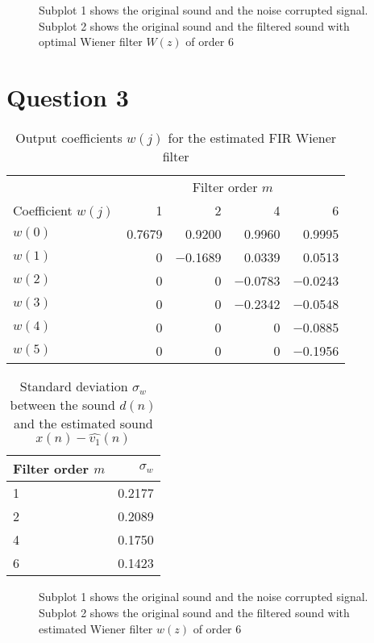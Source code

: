 \documentclass[12pt,a4paper]{article}
\begin{document}
\begin{figure}[h!]
\centering

\caption{Subplot 1 shows the original sound and the noise corrupted signal. Subplot 2 shows the original sound and the filtered sound with optimal Wiener filter $W(z)$ of order \num{6}}
\end{figure}

\clearpage\section*{Question 3}

\begin{table}[h!]
\centering
\caption{Output coefficients $w(j)$ for the estimated FIR Wiener filter}
\begin{tabular}{l r r r r}
\hline
 & \multicolumn{4}{c}{Filter order $m$}\\
 \cline{2-5}
Coefficient $w(j)$ & \num{1} & \num{2} & \num{4} & \num{6} \\
\hline
$w(0)$ & \num{0.7679} & \num{0.9200}& \num{0.9960} & \num{0.9995} \\
$w(1)$ & \num{0} & \num{-0.1689}& \num{0.0339}& \num{0.0513} \\
$w(2)$ & \num{0}& \num{0}& \num{-0.0783}& \num{-0.0243}\\
$w(3)$ & \num{0}& \num{0}& \num{-0.2342}& \num{-0.0548}\\
$w(4)$ & \num{0}& \num{0}& \num{0}& \num{-0.0885}\\
$w(5)$ & \num{0}& \num{0}& \num{0}& \num{-0.1956}\\
\hline
\end{tabular}
\end{table}

\begin{table}[h!]
\centering
\caption{Standard deviation $\sigma_{w}$ between the sound $d(n)$ and the estimated sound $x(n) - \hat{v_{1}}(n)$}
\begin{tabular}{l | r}
Filter order $m$ & $\sigma_{w}$ \\
\hline
\num{1} & \num{0.2177}\\
\num{2} & \num{0.2089}\\
\num{4} & \num{0.1750}\\
\num{6} & \num{0.1423}\\
\hline
\end{tabular}
\end{table}

\begin{figure}[h!]
\centering

\caption{Subplot 1 shows the original sound and the noise corrupted signal. Subplot 2 shows the original sound and the filtered sound with estimated Wiener filter $w(z)$ of order \num{6}}
\end{figure}
\end{document}
